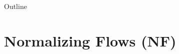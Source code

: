 \documentclass{beamer}
\begin{document}

\begin{frame}
\titlepage
\resetonslide
\end{frame}




\begin{frame}{Outline}
	\tableofcontents
\end{frame}
\section{Normalizing Flows (NF)}
\end{document}
